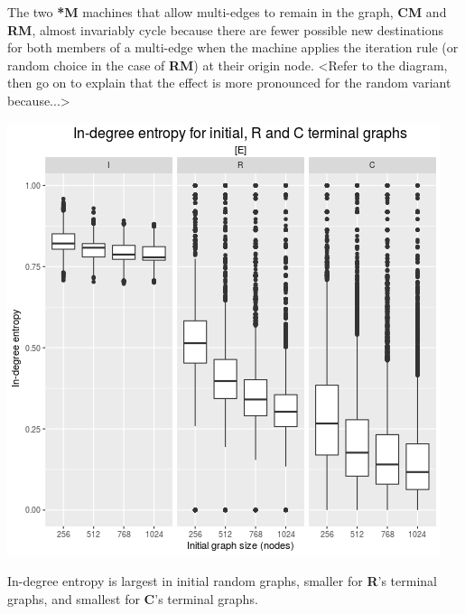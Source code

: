 \documentclass{tufte-handout}
\begin{document}
The two \textbf{*M} machines that allow multi-edges to remain in the graph, \textbf{CM} and
\textbf{RM}, almost invariably cycle because there are fewer possible new destinations for
both members of a multi-edge when the machine applies the iteration rule (or random choice
in the case of \textbf{RM}) at their origin node. <Refer to the diagram, then go on to
explain that the effect is more pronounced for the random variant because...>

\begin{marginfigure}
  \includegraphics{figE.png}
  \caption{In-degree entropy is largest in initial random graphs,
        smaller for \textbf{R}'s terminal graphs, and smallest for \textbf{C}'s terminal graphs.}
  \label{fig:figE}
\end{marginfigure}
\end{document}
